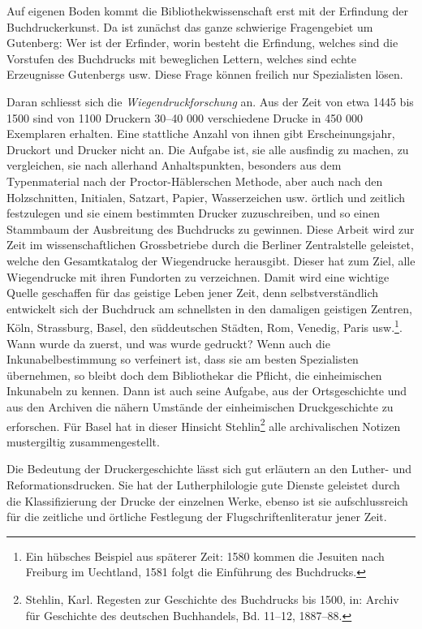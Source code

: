 \documentclass[a4paper,
fontsize=11pt,
oneside,
numbers=noperiodatend,
parskip=half-,
bibliography=totoc,
final
]{scrartcl}
\begin{document}
Auf eigenen Boden kommt die Bibliothekwissenschaft erst mit der
Erfindung der Buchdruckerkunst. Da ist zunächst das ganze schwierige
Fragengebiet um Gutenberg: Wer ist der Erfinder, worin besteht die
Erfindung, welches sind die Vorstufen des Buchdrucks mit beweglichen
Lettern, welches sind echte Erzeugnisse Gutenbergs usw. Diese Frage
können freilich nur Spezialisten lösen.

Daran schliesst sich die \emph{Wiegendruckforschung} an. Aus der Zeit
von etwa 1445 bis 1500 sind von 1100 Druckern 30--40 000 verschiedene
Drucke in 450 000 Exemplaren erhalten. Eine stattliche Anzahl von ihnen
gibt Erscheinungsjahr, Druckort und Drucker nicht an. Die Aufgabe ist,
sie alle ausfindig zu machen, zu vergleichen, sie nach allerhand
Anhaltspunkten, besonders aus dem Typenmaterial nach der
Proctor-Häblerschen Methode, aber auch nach den Holzschnitten,
Initialen, Satzart, Papier, Wasserzeichen usw. örtlich und zeitlich
festzulegen und sie einem bestimmten Drucker zuzuschreiben, und so einen
Stammbaum der Ausbreitung des Buchdrucks zu gewinnen. Diese Arbeit wird
zur Zeit im wissenschaftlichen Grossbetriebe durch die Berliner
Zentralstelle geleistet, welche den Gesamtkatalog der Wiegendrucke
herausgibt. Dieser hat zum Ziel, alle Wiegendrucke mit ihren Fundorten
zu verzeichnen. Damit wird eine wichtige Quelle geschaffen für das
geistige Leben jener Zeit, denn selbstverständlich entwickelt sich der
Buchdruck am schnellsten in den damaligen geistigen Zentren, Köln,
Strassburg, Basel, den süddeutschen Städten, Rom, Venedig, Paris
usw.\footnote{Ein hübsches Beispiel aus späterer Zeit: 1580 kommen die
  Jesuiten nach Freiburg im Uechtland, 1581 folgt die Einführung des
  Buchdrucks.}. Wann wurde da zuerst, und was wurde gedruckt? Wenn auch
die Inkunabelbestimmung so verfeinert ist, dass sie am besten
Spezialisten übernehmen, so bleibt doch dem Bibliothekar die Pflicht,
die einheimischen Inkunabeln zu kennen. Dann ist auch seine Aufgabe, aus
der Ortsgeschichte und aus den Archiven die nähern Umstände der
einheimischen Druckgeschichte zu erforschen. Für Basel hat in dieser
Hinsicht Stehlin\footnote{Stehlin, Karl. Regesten zur Geschichte des
  Buchdrucks bis 1500, in: Archiv für Geschichte des deutschen
  Buchhandels, Bd. 11--12, 1887--88.} alle archivalischen Notizen
mustergiltig zusammengestellt.

Die Bedeutung der Druckergeschichte lässt sich gut erläutern an den
Luther- und Reformationsdrucken. Sie hat der Lutherphilologie gute
Dienste geleistet durch die Klassifizierung der Drucke der einzelnen
Werke, ebenso ist sie aufschlussreich für die zeitliche und örtliche
Festlegung der Flugschriftenliteratur jener Zeit.
\end{document}

